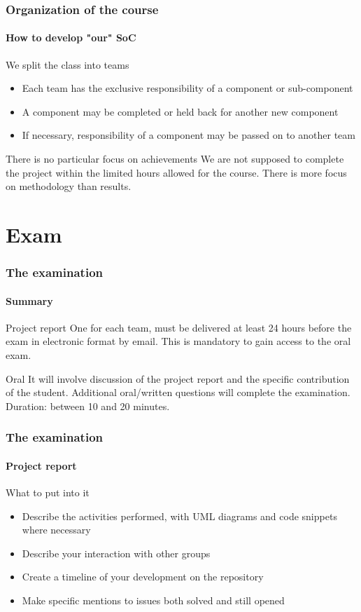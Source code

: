 \begin{frame}
\frametitle{Organization of the course}
\framesubtitle{How to develop "our" SoC}
\begin{block}{We split the class into teams}
\begin{itemize}
\item Each team has the exclusive responsibility of a component or sub-component
\item A component may be completed or held back for another new component
\item If necessary, responsibility of a component may be passed on to another team
\end{itemize}
\end{block}
\pause
\begin{block}{There is no particular focus on achievements}
We are not supposed to complete the project within the limited hours allowed for the course. There is more
focus on methodology than results.
\end{block}

\end{frame}

\section{Exam}

\begin{frame}
\frametitle{The examination}
\framesubtitle{Summary}
\begin{block}{Project report}
One for each team, must be delivered at least 24 hours before the exam in electronic format by email. This is mandatory to gain
access to the oral exam.
\end{block}

\begin{block}{Oral}
It will involve discussion of the project report and the specific contribution of the student. Additional
oral/written questions will complete the examination. Duration: between 10 and 20 minutes.
\end{block}

\end{frame}

\begin{frame}
\frametitle{The examination}
\framesubtitle{Project report}

\begin{block}{What to put into it}
\begin{itemize}
\item Describe the activities performed, with UML diagrams and code snippets where necessary
\item Describe your interaction with other groups
\item Create a timeline of your development on the repository
\item Make specific mentions to issues both solved and still opened
\end{itemize}
\end{block}

\end{frame}

